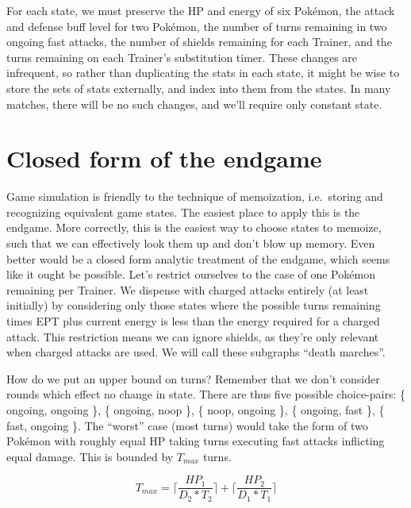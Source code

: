 For each state, we must preserve the HP and energy of six Pokémon,
  the attack and defense buff level for two Pokémon,
  the number of turns remaining in two ongoing fast attacks,
  the number of shields remaining for each Trainer,
  and the turns remaining on each Trainer's substitution timer.
These changes are infrequent, so rather than duplicating the stats in
  each state, it might be wise to store the sets of stats externally,
  and index into them from the states.
In many matches, there will be no such changes, and we'll require
  only constant state.

\section{Closed form of the endgame}
Game simulation is friendly to the technique of memoization, i.e.\ storing
  and recognizing equivalent game states.
The easiest place to apply this is the endgame.
More correctly, this is the easiest way to choose states to memoize,
  such that we can effectively look them up and don't blow up memory.
Even better would be a closed form analytic treatment of the endgame,
  which seems like it ought be possible.
Let's restrict ourselves to the case of one Pokémon remaining per Trainer.
We dispense with charged attacks entirely (at least initially) by considering
  only those states where the possible turns remaining times EPT plus current
  energy is less than the energy required for a charged attack.
This restriction means we can ignore shields, as they're only relevant
  when charged attacks are used.
We will call these subgraphs ``death marches''.

How do we put an upper bound on turns?
Remember that we don't consider rounds which effect no change in state.
There are thus five possible choice-pairs:
  \{ ongoing, ongoing \},
  \{ ongoing, noop \},
  \{ noop, ongoing \},
  \{ ongoing, fast \},
  \{ fast, ongoing \}.
The ``worst'' case (most turns) would take the form of two Pokémon
  with roughly equal HP taking turns executing fast attacks
  inflicting equal damage.
This is bounded by $T_{max}$ turns.

\[ T_{max} = \lceil\frac{HP_1}{D_2 * T_2}\rceil + \lceil\frac{HP_2}{D_1 * T_1}\rceil \]

